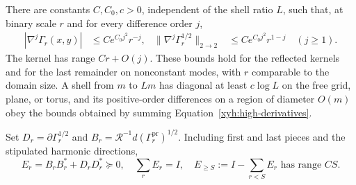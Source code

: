 \begin{lemma}\label{xyh:kernels}
There are constants $C,C_0,c>0$, independent of the shell ratio $L$, such
that, at binary scale $r$ and for every difference order $j$,
\begin{align}
 |\nabla^j\Gamma_r(x,y)|&\le C e^{C_0j^2}r^{-j},
 &\|\nabla^j\Gamma_r^{1/2}\|_{2\to2}
  &\le C e^{C_0j^2}r^{1-j}\quad(j\ge1).
 \label{xyh:high-derivatives}
\end{align}
The kernel has range $Cr+O(j)$. These bounds hold for the reflected kernels
and for the last remainder on nonconstant modes, with $r$ comparable to
the domain size. A shell from $m$ to $Lm$ has diagonal at least $c\log L$
on the free grid, plane, or torus, and its positive-order differences on
a region of diameter $O(m)$ obey the bounds obtained by summing
Equation~\eqref{xyh:high-derivatives}.

Set $D_r=\partial\Gamma_r^{1/2}$ and
$B_r=\mathcal R^{-1}d(\Gamma_r^{\mathrm{pr}})^{1/2}$. Including first
and last pieces and the stipulated harmonic directions,
\begin{equation}\label{xyh:white-resolution}
 E_r=B_rB_r^*+D_rD_r^*\succeq0,\quad \sum_rE_r=I,
 \quad E_{\ge S}:=I-\sum_{r<S}E_r
 \text{ has range }CS.
\end{equation}
\end{lemma}
